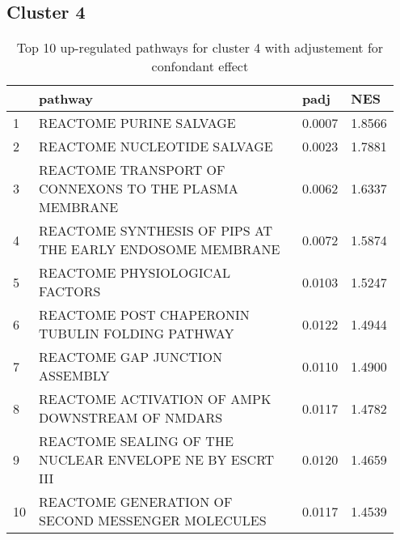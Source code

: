\documentclass{article}
\begin{document}
\subsection{Cluster 4 }
\begin{table}[H]
\centering
\begin{tabular}{p{0.05\linewidth}p{0.7\linewidth}p{0.1\linewidth}p{0.1\linewidth}}
  \hline
 & pathway & padj & NES \\ 
  \hline
1 & REACTOME PURINE SALVAGE & 0.0007 & 1.8566 \\ 
  2 & REACTOME NUCLEOTIDE SALVAGE & 0.0023 & 1.7881 \\ 
  3 & REACTOME TRANSPORT OF CONNEXONS TO THE PLASMA MEMBRANE & 0.0062 & 1.6337 \\ 
  4 & REACTOME SYNTHESIS OF PIPS AT THE EARLY ENDOSOME MEMBRANE & 0.0072 & 1.5874 \\ 
  5 & REACTOME PHYSIOLOGICAL FACTORS & 0.0103 & 1.5247 \\ 
  6 & REACTOME POST CHAPERONIN TUBULIN FOLDING PATHWAY & 0.0122 & 1.4944 \\ 
  7 & REACTOME GAP JUNCTION ASSEMBLY & 0.0110 & 1.4900 \\ 
  8 & REACTOME ACTIVATION OF AMPK DOWNSTREAM OF NMDARS & 0.0117 & 1.4782 \\ 
  9 & REACTOME SEALING OF THE NUCLEAR ENVELOPE NE BY ESCRT III & 0.0120 & 1.4659 \\ 
  10 & REACTOME GENERATION OF SECOND MESSENGER MOLECULES & 0.0117 & 1.4539 \\ 
   \hline
\end{tabular}
\caption{Top 10 up-regulated pathways for cluster 4 with adjustement for confondant effect} 
\label{tab:q3_2_conf_4}
\end{table}
\end{document}
